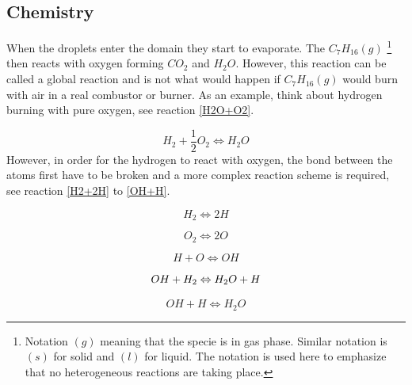 \documentclass{report}
\begin{document}
\subsection{Chemistry}
\label{Chemistry}
When the droplets enter the domain they start to evaporate. The $C_7H_{16} (g)$ \footnote{Notation $(g)$  meaning that the specie is in gas phase. Similar notation is $(s)$ for solid and $(l)$ for liquid. The notation is used here to emphasize that no heterogeneous reactions are taking place.} then reacts with oxygen forming $CO_2$ and $H_{2}O$. However, this reaction can be called a global reaction and is not what would happen if $C_7H_{16} (g)$ would burn with air in a real combustor or burner. As an example, think about hydrogen burning with pure oxygen, see reaction \ref{H2O+O2}.  

\begin{equation}
\label{H2O+O2}
H_{2} +\frac{1}{2}O_{2} \Leftrightarrow H_{2}O	
\end{equation}    
\noindent
However, in order for the hydrogen to react with oxygen, the bond between the atoms first have to be broken and a more complex reaction scheme is required, see reaction \ref{H2+2H} to \ref{OH+H}.    

\begin{equation}
\label{H2+2H}
H_{2}  \Leftrightarrow 2H	
\end{equation}

\begin{equation}
\label{O2+2O}
O_{2}  \Leftrightarrow 2O	
\end{equation}

\begin{equation}
\label{H+O}
H+O  \Leftrightarrow OH	
\end{equation}

\begin{equation}
\label{OH+H_{2}}
OH+H_{2} \Leftrightarrow H_{2}O+H
\end{equation}

\begin{equation}
\label{OH+H}
OH+H \Leftrightarrow H_{2}O
\end{equation}
\end{document}
